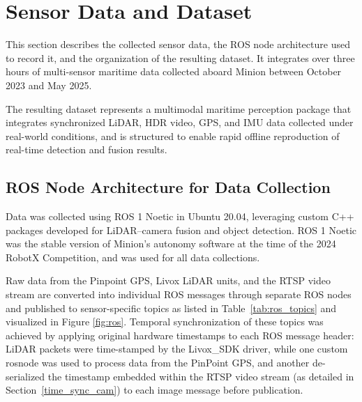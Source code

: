 \documentclass{erauthesis}
\begin{document}
\section{Sensor Data and Dataset} \label{sec:sensor_data_dataset}

This section describes the collected sensor data, the ROS node architecture used to record it, and the organization of the resulting dataset.
It integrates over three hours of multi-sensor maritime data collected aboard Minion between October 2023 and May 2025.

The resulting dataset represents a multimodal maritime perception package that integrates synchronized LiDAR, HDR video, GPS, and IMU data collected under real-world conditions, and is structured to enable rapid offline reproduction of real-time detection and fusion results.


\subsection{ROS Node Architecture for Data Collection}
\label{sec:ros_architecture}

Data was collected using ROS 1 Noetic in Ubuntu 20.04, leveraging custom C++ packages developed for LiDAR–camera fusion and object detection.  
ROS 1 Noetic was the stable version of Minion's autonomy software at the time of the 2024 RobotX Competition, and was used for all data collections.%

Raw data from the Pinpoint GPS, Livox LiDAR units, and the RTSP video stream are converted into individual ROS messages through separate ROS nodes and published to sensor-specific topics as listed in Table~\ref{tab:ros_topics} and visualized in Figure \ref{fig:ros}.  
Temporal synchronization of these topics was achieved by applying original hardware timestamps to each ROS message header: LiDAR packets were time-stamped by the Livox\_SDK driver, while one custom rosnode was used to process data from the PinPoint GPS, and another de-serialized the timestamp embedded within the \ac{RTSP} video stream (as detailed in Section~\ref{time_sync_cam}) to each image message before publication.
\end{document}
